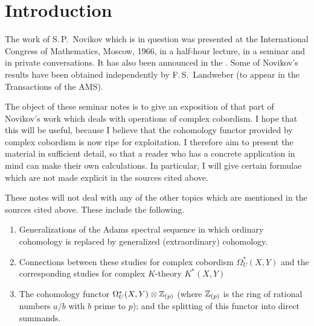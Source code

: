 \documentclass[../main]{subfiles}
\begin{document}
\chapter{Introduction}
\label{sec:p1c1}

The work of S.\,P.~Novikov which is in question was presented at the International Congress of Mathematics, Moscow, 1966, in a half-hour lecture, in a seminar and in private conversations. 
It has also been announced in the \cite{novikov2}.
Some of Novikov's results have been obtained independently by F.\,S.~Landweber (to appear in the Transactions of the AMS).

The object of these seminar notes is to give an exposition of that part of Novikov's work which deals with operations of complex cobordism.
I hope that this will be useful, because I believe that the cohomology functor provided by complex cobordism is now ripe for exploitation.
I therefore aim to present the material in sufficient detail, so that a reader who has a concrete application in mind can make their own calculations. 
In particular, I will give certain formulae which are not made explicit in the sources cited above.

These notes will not deal with any of the other topics which are mentioned in the sources cited above. 
These include the following.
\begin{enumerate}[label=(\roman*)] %
\item Generalizations of the Adams spectral sequence in which ordinary cohomology is replaced by generalized (extraordinary) cohomology.
\item Connections between these studies for complex cobordism $\Omega_U^* (X, Y)$ and the corresponding studies for complex $K$-theory $K^* (X, Y)$
\item The cohomology functor $\Omega_U^* (X, Y) \otimes \mathbb{Z}_{(p)}$ (where $\mathbb{Z}_{(p)}$ is the ring of rational numbers $a/b$ with $b$ prime to $p$); and the splitting of this functor into direct summands. %
\end{enumerate}
\end{document}
